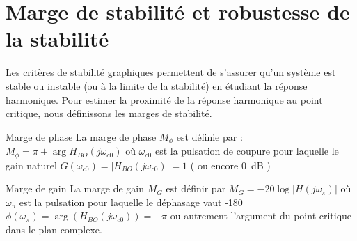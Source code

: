 \section{Marge de stabilité et robustesse de la stabilité}
Les critères de stabilité graphiques permettent de s'assurer qu'un système 
est stable ou instable (ou à la limite de la stabilité) en étudiant la réponse
harmonique. Pour estimer la proximité de la réponse harmonique au point 
critique, nous définissons les marges de stabilité. 
\begin{definition}{Marge de phase}
La marge de phase $M_{\phi}$ est définie par :
$M_\phi=\pi+\arg{H_{BO}(j\omega_{c0})}$ où $\omega_{c0}$ est la pulsation de 
coupure pour laquelle le gain naturel $G(\omega_{c0})=|H_{BO}(j\omega_{c0})|=1$
( ou encore 0~\si{\dB} ) 
\end{definition}
\begin{definition}{Marge de gain}
La marge de gain $M_G$ est définir par $M_G=-20\log{|H(j\omega_\pi)|}$ où 
$\omega_{\pi}$ est la pulsation pour laquelle le déphasage vaut 
-180\degreeSI $\phi(\omega_\pi)=\arg{(H_{BO}(j\omega_{c0}))}=-\pi$
ou autrement l'argument du point critique dans le plan complexe.
\end{definition}
